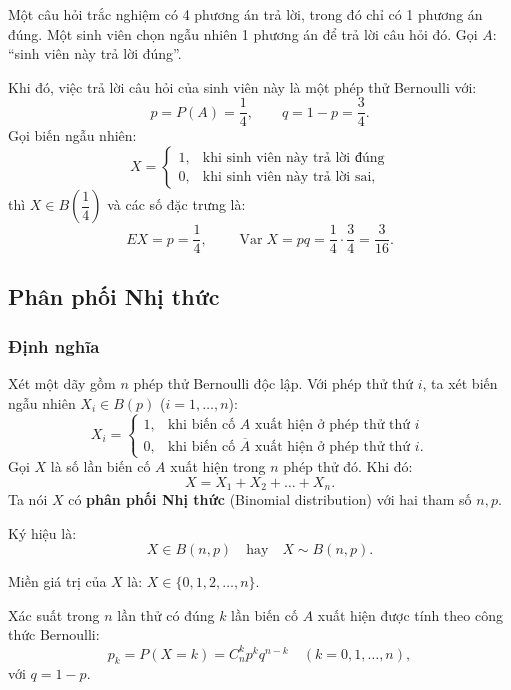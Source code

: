 \begin{vidu}[VD 1]
Một câu hỏi trắc nghiệm có 4 phương án trả lời, trong đó chỉ có 1 phương án đúng. Một sinh viên chọn ngẫu nhiên 1 phương án để trả lời câu hỏi đó.
Gọi $A$: ``sinh viên này trả lời đúng''.

Khi đó, việc trả lời câu hỏi của sinh viên này là một phép thử Bernoulli với:
\[
p = P(A) = \frac{1}{4}, \qquad q = 1 - p = \frac{3}{4}.
\]
Gọi biến ngẫu nhiên:
\[
X = \begin{cases} 
1, & \text{khi sinh viên này trả lời đúng} \\ 
0, & \text{khi sinh viên này trả lời sai}, 
\end{cases}
\]
thì $X \in B\left(\dfrac{1}{4}\right)$ và các số đặc trưng là:
\[
EX = p = \frac{1}{4}, \qquad \operatorname{Var} X = pq = \frac{1}{4} \cdot \frac{3}{4} = \frac{3}{16}.
\]
\end{vidu}

\subsection{Phân phối Nhị thức}

\subsubsection{Định nghĩa}

\begin{dinhnghia}
Xét một dãy gồm $n$ phép thử Bernoulli độc lập. Với phép thử thứ $i$, ta xét biến ngẫu nhiên $X_i \in B(p)$ ($i = 1, \dots, n$):
\[
X_i = \begin{cases} 
1, & \text{khi biến cố } A \text{ xuất hiện ở phép thử thứ } i \\ 
0, & \text{khi biến cố } \overline{A} \text{ xuất hiện ở phép thử thứ } i. 
\end{cases}
\]
Gọi $X$ là số lần biến cố $A$ xuất hiện trong $n$ phép thử đó. Khi đó:
\[
X = X_1 + X_2 + \dots + X_n.
\]
Ta nói $X$ có \textbf{phân phối Nhị thức} (Binomial distribution) với hai tham số $n, p$.

Ký hiệu là:
\[
X \in B(n, p) \quad \text{hay} \quad X \sim B(n, p).
\]

Miền giá trị của $X$ là: $X \in \{0, 1, 2, \dots, n\}$.

Xác suất trong $n$ lần thử có đúng $k$ lần biến cố $A$ xuất hiện được tính theo công thức Bernoulli:
\[
p_k = P(X = k) = C_n^k p^k q^{n - k} \quad (k = 0, 1, \dots, n),
\]
với $q = 1 - p$.
\end{dinhnghia}

